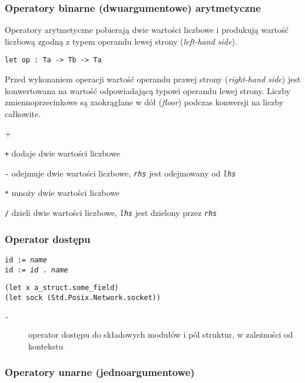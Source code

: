 \subsubsection{Operatory binarne (dwuargumentowe) arytmetyczne}

Operatory arytmetyczne pobierają dwie wartości liczbowe i produkują wartość
liczbową zgodną z typem operandu lewej strony (\emph{left-hand side}).

\begin{lstlisting}
let op : Ta -> Tb -> Ta
\end{lstlisting}

Przed wykonaniem operacji wartość operandu prawej strony (\emph{right-hand side})
jest konwertowana na wartość odpowiadającą typowi operandu lewej strony. Liczby
zmiennoprzecinkowe są zaokrąglane w dół (\emph{floor}) podczas konwersji na
liczby całkowite.

\begin{labeling}{+}
    \item[\texttt{+}] dodaje dwie wartości liczbowe
    \item[\texttt{-}] odejmuje dwie wartości liczbowe, \emph{\texttt{rhs}} jest odejmowany od
        \emph{\texttt{lhs}}
    \item[\texttt{*}] mnoży dwie wartości liczbowe
    \item[\texttt{/}] dzieli dwie wartości liczbowe, \emph{\texttt{lhs}} jest dzielony przez
        \emph{\texttt{rhs}}
\end{labeling}

\subsubsection{Operator dostępu}

\texttt{id := \emph{name}} \\
\texttt{id := \emph{id} . \emph{name}}

\begin{lstlisting}
(let x a_struct.some_field)
(let sock (Std.Posix.Network.socket))
\end{lstlisting}

\begin{description}
    \item[\texttt{.}] operator dostępu do składowych modułów i pól struktur, w zależności od kontekstu
\end{description}

\subsubsection{Operatory unarne (jednoargumentowe)}

